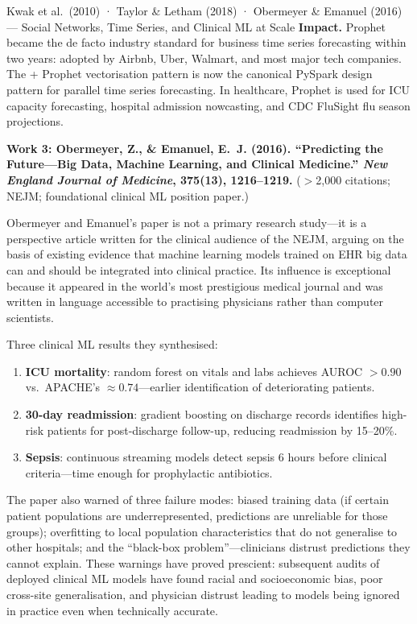 \begin{researchspotlight}{Kwak et al.\ (2010) · Taylor \& Letham (2018)
  · Obermeyer \& Emanuel (2016) --- Social Networks, Time Series, and
  Clinical ML at Scale}
\textbf{Impact.} Prophet became the de facto industry standard for
business time series forecasting within two years: adopted by Airbnb,
Uber, Walmart, and most major tech companies. The 
+ Prophet vectorisation pattern is now the canonical PySpark design
pattern for parallel time series forecasting. In healthcare, Prophet
is used for ICU capacity forecasting, hospital admission nowcasting,
and CDC FluSight flu season projections.

\medskip
\textbf{Work 3: Obermeyer, Z., \& Emanuel, E.~J. (2016). ``Predicting
the Future---Big Data, Machine Learning, and Clinical Medicine.''
\textit{New England Journal of Medicine}, 375(13), 1216--1219.}
($>$2{,}000 citations; NEJM; foundational clinical ML position paper.)

Obermeyer and Emanuel's paper is not a primary research study---it is
a perspective article written for the clinical audience of the NEJM,
arguing on the basis of existing evidence that machine learning models
trained on EHR big data can and should be integrated into clinical
practice. Its influence is exceptional because it appeared in the world's
most prestigious medical journal and was written in language accessible
to practising physicians rather than computer scientists.

Three clinical ML results they synthesised:
\begin{enumerate}
  \item \textbf{ICU mortality}: random forest on vitals and labs achieves
        AUROC $>0.90$ vs.\ APACHE's $\approx 0.74$---earlier identification
        of deteriorating patients.
  \item \textbf{30-day readmission}: gradient boosting on discharge records
        identifies high-risk patients for post-discharge follow-up,
        reducing readmission by 15--20\%.
  \item \textbf{Sepsis}: continuous streaming models detect sepsis 6 hours
        before clinical criteria---time enough for prophylactic antibiotics.
\end{enumerate}

The paper also warned of three failure modes: biased training data (if
certain patient populations are underrepresented, predictions are
unreliable for those groups); overfitting to local population
characteristics that do not generalise to other hospitals; and the
``black-box problem''---clinicians distrust predictions they cannot
explain. These warnings have proved prescient: subsequent audits of
deployed clinical ML models have found racial and socioeconomic bias,
poor cross-site generalisation, and physician distrust leading to
models being ignored in practice even when technically accurate.
\end{researchspotlight}

